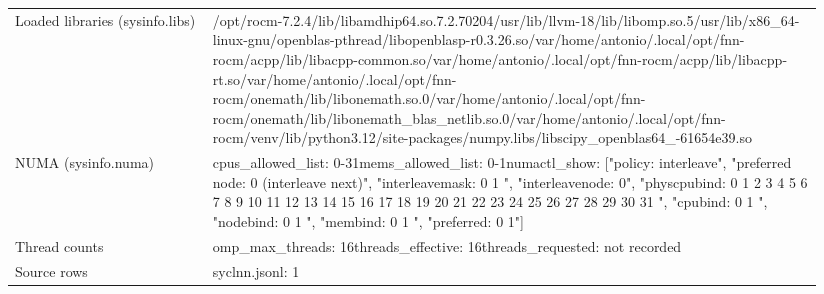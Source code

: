 \begin{longtable}{>{\raggedright\arraybackslash}p{0.23\linewidth}>{\raggedright\arraybackslash}p{0.71\linewidth}}
Loaded libraries (sysinfo.libs) & /\allowbreak{}opt/\allowbreak{}rocm-7.2.4/\allowbreak{}lib/\allowbreak{}libamdhip64.so.7.2.70204\newline /\allowbreak{}usr/\allowbreak{}lib/\allowbreak{}llvm-18/\allowbreak{}lib/\allowbreak{}libomp.so.5\newline /\allowbreak{}usr/\allowbreak{}lib/\allowbreak{}x86\_\allowbreak{}64-linux-gnu/\allowbreak{}openblas-pthread/\allowbreak{}libopenblasp-r0.3.26.so\newline /\allowbreak{}var/\allowbreak{}home/\allowbreak{}antonio/\allowbreak{}.local/\allowbreak{}opt/\allowbreak{}fnn-rocm/\allowbreak{}acpp/\allowbreak{}lib/\allowbreak{}libacpp-common.so\newline /\allowbreak{}var/\allowbreak{}home/\allowbreak{}antonio/\allowbreak{}.local/\allowbreak{}opt/\allowbreak{}fnn-rocm/\allowbreak{}acpp/\allowbreak{}lib/\allowbreak{}libacpp-rt.so\newline /\allowbreak{}var/\allowbreak{}home/\allowbreak{}antonio/\allowbreak{}.local/\allowbreak{}opt/\allowbreak{}fnn-rocm/\allowbreak{}onemath/\allowbreak{}lib/\allowbreak{}libonemath.so.0\newline /\allowbreak{}var/\allowbreak{}home/\allowbreak{}antonio/\allowbreak{}.local/\allowbreak{}opt/\allowbreak{}fnn-rocm/\allowbreak{}onemath/\allowbreak{}lib/\allowbreak{}libonemath\_\allowbreak{}blas\_\allowbreak{}netlib.so.0\newline /\allowbreak{}var/\allowbreak{}home/\allowbreak{}antonio/\allowbreak{}.local/\allowbreak{}opt/\allowbreak{}fnn-rocm/\allowbreak{}venv/\allowbreak{}lib/\allowbreak{}python3.12/\allowbreak{}site-packages/\allowbreak{}numpy.libs/\allowbreak{}libscipy\_\allowbreak{}openblas64\_\allowbreak{}-61654e39.so \\
NUMA (sysinfo.numa) & cpus\_\allowbreak{}allowed\_\allowbreak{}list: 0-31\newline mems\_\allowbreak{}allowed\_\allowbreak{}list: 0-1\newline numactl\_\allowbreak{}show: ["policy: interleave", "preferred node: 0 (interleave next)", "interleavemask: 0 1 ", "interleavenode: 0", "physcpubind: 0 1 2 3 4 5 6 7 8 9 10 11 12 13 14 15 16 17 18 19 20 21 22 23 24 25 26 27 28 29 30 31 ", "cpubind: 0 1 ", "nodebind: 0 1 ", "membind: 0 1 ", "preferred: 0 1"] \\
Thread counts & omp\_\allowbreak{}max\_\allowbreak{}threads: 16\newline threads\_\allowbreak{}effective: 16\newline threads\_\allowbreak{}requested: not recorded \\
Source rows & syclnn.jsonl: 1 \\
\end{longtable}
